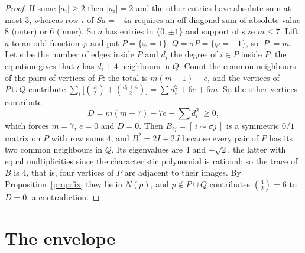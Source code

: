 \documentclass[11pt]{amsart}
\theoremstyle{definition}
\theoremstyle{remark}
\newcommand{\s}{\sigma}
\begin{document}
\begin{proof}
If some $|a_i|\ge2$ then $|a_i|=2$ and the other entries have absolute sum at most $3$, whereas row $i$ of $Sa=-4a$ requires
an off-diagonal sum of absolute value $8$ (outer) or $6$ (inner). So $a$ has entries in $\{0,\pm1\}$ and support of size
$m\le 7$. Lift $a$ to an odd function $\varphi$ and put $P=\{\varphi=1\}$, $Q=\s P=\{\varphi=-1\}$, so $|P|=m$. Let $e$ be the
number of edges inside $P$ and $d_i$ the degree of $i\in P$ inside $P$; the equation gives that $i$ has $d_i+4$ neighbours in
$Q$. Count the common neighbours of the pairs of vertices of $P$: the total is $m(m-1)-e$, and the vertices of $P\cup Q$
contribute $\sum_i\bigl[\binom{d_i}{2}+\binom{d_i+4}{2}\bigr]=\sum d_i^2+6e+6m$. So the other vertices contribute
\[
D=m(m-7)-7e-\textstyle\sum d_i^2\ \ge 0 ,
\]
which forces $m=7$, $e=0$ and $D=0$. Then $B_{ij}=[\,i\sim\s j\,]$ is a symmetric $0/1$ matrix on $P$ with row sums $4$, and
$B^2=2I+2J$ because every pair of $P$ has its two common neighbours in $Q$. Its eigenvalues are $4$ and $\pm\sqrt2$, the
latter with equal multiplicities since the characteristic polynomial is rational; so the trace of $B$ is $4$, that is, four
vertices of $P$ are adjacent to their images. By Proposition~\ref{prop:fix} they lie in $N(p)$, and $p\notin P\cup Q$
contributes $\binom42=6$ to $D=0$, a contradiction.
\end{proof}

\section{The envelope}\label{sec:env}
\end{document}
